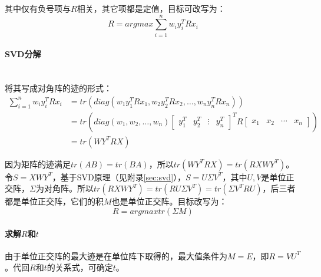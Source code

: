 \documentclass[
12pt, %
a4paper, 
oneside, %
headinclude,footinclude, %
]{scrartcl}
\begin{document}
其中仅有负号项与$ R $相关，其它项都是定值，目标可改写为：
$$ R = argmax \sum_{i = 1}^{n}w_i y_i^T R x_i $$
\paragraph{SVD分解}\label{sec:svd back}~\\

将其写成对角阵的迹的形式：
\begin{align*}
\sum_{i = 1}^{n} w_i y_i^T R x_i 
&= tr(diag(w_1 y_1^T R x_1, w_2 y_2^T R x_2, \dots, w_n y_n^T R x_n)) \\
&= tr(diag(w_1, w_2, \dots, w_n) \begin{bmatrix} y_1^T & y_2^T & \vdots & y_n^T \end{bmatrix}^T R \begin{bmatrix} x_1 & x_2 & \cdots & x_n \end{bmatrix}) \\
&= tr(WY^TRX)
\end{align*}

因为矩阵的迹满足$ tr(AB) = tr(BA) $，所以$ tr(WY^TRX) = tr(RXWY^T) $。令$ S = XWY^T $，基于SVD原理（见附录\ref{sec:svd}），$ S = U \Sigma V^T $，其中$ U,V $是单位正交阵，$ \Sigma $为对角阵。所以$ tr(RXWY^T) = tr(RU \Sigma V^T) = tr(\Sigma V^TRU) $，后三者都是单位正交阵，它们的积$ M $也是单位正交阵。目标改写为：
$$ R = argmax tr(\Sigma M) $$
\paragraph{求解$ R $和$ t $}
由于单位正交阵的最大迹是在单位阵下取得的，最大值条件为$ M = E $，即$ R = VU^T $。代回$ R $和$ t $的关系式，可确定$ t $。
\end{document}
